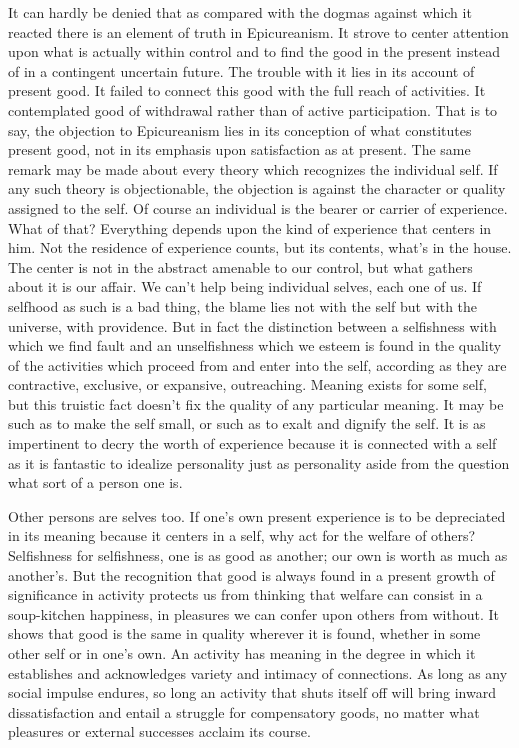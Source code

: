 \documentclass[12pt]{article}
\begin{document}
It can hardly be denied that as compared with the
dogmas against which it reacted there is an element of
truth in Epicureanism. It strove to center attention
upon what is actually within control and to find the
good in the present instead of in a contingent uncertain
future. The trouble with it lies in its account of
present good. It failed to connect this good with the
full reach of activities. It contemplated good of withdrawal
rather than of active participation. That is
to say, the objection to Epicureanism lies in its conception
of what constitutes present good, not in its
emphasis upon satisfaction as at present. The same remark
may be made about every theory which recognizes
the individual self. If any such theory is objectionable,
the objection is against the character or quality
assigned to the self. Of course an individual is the
bearer or carrier of experience. What of that? Everything
depends upon the kind of experience that centers
in him. Not the residence of experience counts, but its
contents, what's in the house. The center is not in the
abstract amenable to our control, but what gathers
about it is our affair. We can't help being individual
selves, each one of us. If selfhood as such is a bad
thing, the blame lies not with the self but with the universe,
with providence. But in fact the distinction between
a selfishness with which we find fault and an
unselfishness which we esteem is found in the quality
of the activities which proceed from and enter into the
self, according as they are contractive, exclusive, or
expansive, outreaching. Meaning exists for some self,
but this truistic fact doesn't fix the quality of any particular
meaning. It may be such as to make the self
small, or such as to exalt and dignify the self. It is
as impertinent to decry the worth of experience because
it is connected with a self as it is fantastic to
idealize personality just as personality aside from the
question what sort of a person one is.

Other persons are selves too. If one's own present
experience is to be depreciated in its meaning because
it centers in a self, why act for the welfare of others?
Selfishness for selfishness, one is as good as another;
our own is worth as much as another's. But the recognition
that good is always found in a present growth
of significance in activity protects us from thinking
that welfare can consist in a soup-kitchen happiness,
in pleasures we can confer upon others from without.
It shows that good is the same in quality wherever it is
found, whether in some other self or in one's own. An
activity has meaning in the degree in which it establishes
and acknowledges variety and intimacy of connections.
As long as any social impulse endures, so long an activity
that shuts itself off will bring inward dissatisfaction
and entail a struggle for compensatory goods, no matter
what pleasures or external successes acclaim its
course.
\end{document}
